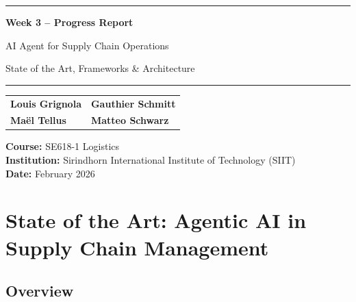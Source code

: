 \documentclass[11pt,a4paper]{article}
\begin{document}
\begin{titlepage}
\centering
\vspace*{3cm}

{\color{MidnightBlue}\rule{\linewidth}{1.2pt}}

\vspace{1.5cm}
{\Huge\bfseries\color{MidnightBlue} Week 3 -- Progress Report}

\vspace{0.8cm}
{\LARGE AI Agent for Supply Chain Operations}

\vspace{0.5cm}
{\large\color{gray} State of the Art, Frameworks \& Architecture}

\vspace{1.5cm}
{\color{MidnightBlue}\rule{\linewidth}{1.2pt}}

\vspace{2cm}

{\large
\begin{tabular}{ll}
\textbf{Louis Grignola} & \textbf{Gauthier Schmitt} \\[0.3em]
\textbf{Ma\"el Tellus}    & \textbf{Matteo Schwarz}   \\
\end{tabular}
}

\vspace{2cm}

{\large
\textbf{Course:} SE618-1 Logistics\\[0.4em]
\textbf{Institution:} Sirindhorn International Institute of Technology (SIIT)\\[0.4em]
\textbf{Date:} February 2026
}

\vfill
\end{titlepage}

\newpage
\tableofcontents
\newpage

\section{State of the Art: Agentic AI in Supply Chain Management}

\subsection{Overview}
\end{document}
